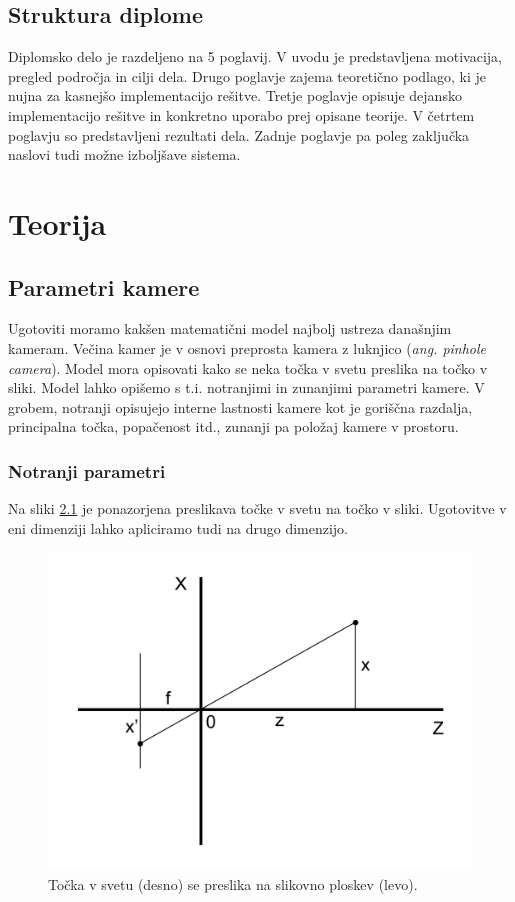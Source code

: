 \documentclass[a4paper, 12pt]{book}
\begin{document}
\section{Struktura diplome}
Diplomsko delo je razdeljeno na 5 poglavij. V uvodu je predstavljena motivacija, pregled področja in cilji dela. Drugo poglavje zajema teoretično podlago, ki je nujna za kasnejšo implementacijo rešitve. Tretje poglavje opisuje dejansko implementacijo rešitve in konkretno uporabo prej opisane teorije. V četrtem poglavju so predstavljeni rezultati dela. Zadnje poglavje pa poleg zaključka naslovi tudi možne izboljšave sistema.

\chapter{Teorija}
\section{Parametri kamere}\label{parametri}
Ugotoviti moramo kakšen matematični model najbolj ustreza današnjim kameram. Večina kamer je v osnovi preprosta kamera z luknjico (\emph{ang. pinhole camera}). Model mora opisovati kako se neka točka v svetu preslika na točko v sliki. Model lahko opišemo s t.i. notranjimi in zunanjimi parametri kamere. V grobem, notranji opisujejo interne lastnosti kamere kot je goriščna razdalja, principalna točka, popačenost itd., zunanji pa položaj kamere v prostoru.

\subsection{Notranji parametri}
Na sliki \ref{similar1} je ponazorjena preslikava točke v svetu na točko v sliki. Ugotovitve v eni dimenziji lahko apliciramo tudi na drugo dimenzijo. 

\begin{figure}[H]
\centering
\includegraphics[width=\textwidth,height=\textheight,keepaspectratio]{similar_triangles_1.png}
\caption{Točka v svetu (desno) se preslika na slikovno ploskev (levo).}
\label{similar1}
\end{figure}
\end{document}
